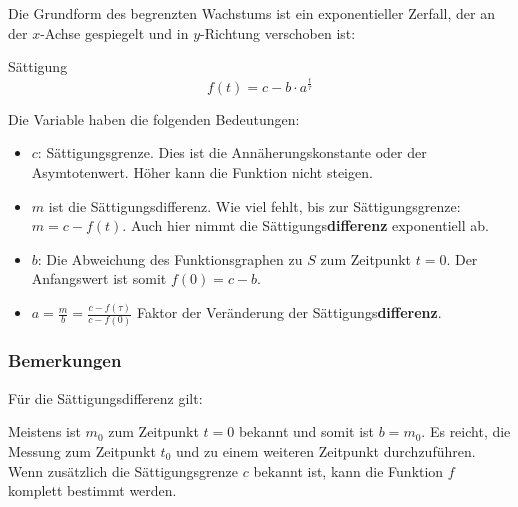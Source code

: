 Die Grundform des begrenzten Wachstums ist ein exponentieller Zerfall,
der an der $x$-Achse gespiegelt und in $y$-Richtung
verschoben ist:

\begin{definition}{Sättigung}{}
$$f(t) =c - b\cdot{} a^{\frac{t}{\tau}}$$
\end{definition}

Die Variable haben die folgenden Bedeutungen:

\begin{itemize}
	\item $c$: Sättigungsgrenze. Dies ist die Annäherungskonstante oder der Asymtotenwert. Höher kann die Funktion nicht steigen.

	\item $m$ ist die
    Sättigungsdifferenz. Wie viel fehlt, bis zur
    Sättigungsgrenze: $m = c - f(t)$. Auch hier nimmt die Sättigungs\textbf{differenz} exponentiell ab.
	\item $b$: Die Abweichung des Funktionsgraphen zu $S$ zum Zeitpunkt $t=0$. Der
    Anfangswert ist somit $f(0) = c - b$.
\item $a=\frac{m}{b}=\frac{c-f(\tau)}{c-f(0)}$ Faktor der Veränderung
  der Sättigungs\textbf{differenz}.
\end{itemize}


\subsubsection{Bemerkungen}
\begin{bemerkung}{}{}
  Für die Sättigungsdifferenz gilt:

\end{bemerkung}



\begin{bemerkung}{}{}
Meistens ist $m_0$ zum Zeitpunkt $t=0$ bekannt und somit ist $b=m_0$. Es reicht, die Messung zum Zeitpunkt $t_0$ und zu einem weiteren Zeitpunkt durchzuführen. Wenn zusätzlich die Sättigungsgrenze $c$ bekannt ist, kann die Funktion $f$ komplett bestimmt werden.
\end{bemerkung} 

